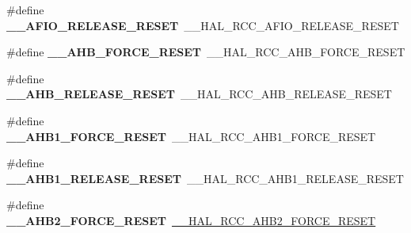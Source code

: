 \begin{DoxyCompactItemize}
\item 
\mbox{\label{group___h_a_l___r_c_c___aliased_gaadb5113bd9b830d9b8db0fa5764b23af}} 
\#define {\bfseries \+\_\+\+\_\+\+A\+F\+I\+O\+\_\+\+R\+E\+L\+E\+A\+S\+E\+\_\+\+R\+E\+S\+ET}~\+\_\+\+\_\+\+H\+A\+L\+\_\+\+R\+C\+C\+\_\+\+A\+F\+I\+O\+\_\+\+R\+E\+L\+E\+A\+S\+E\+\_\+\+R\+E\+S\+ET
\item 
\mbox{\label{group___h_a_l___r_c_c___aliased_ga1cc42f2b9cb1a6c13f6d2453f8fd6451}} 
\#define {\bfseries \+\_\+\+\_\+\+A\+H\+B\+\_\+\+F\+O\+R\+C\+E\+\_\+\+R\+E\+S\+ET}~\+\_\+\+\_\+\+H\+A\+L\+\_\+\+R\+C\+C\+\_\+\+A\+H\+B\+\_\+\+F\+O\+R\+C\+E\+\_\+\+R\+E\+S\+ET
\item 
\mbox{\label{group___h_a_l___r_c_c___aliased_gafd2237a0d990dfe8f203436c0e0315ee}} 
\#define {\bfseries \+\_\+\+\_\+\+A\+H\+B\+\_\+\+R\+E\+L\+E\+A\+S\+E\+\_\+\+R\+E\+S\+ET}~\+\_\+\+\_\+\+H\+A\+L\+\_\+\+R\+C\+C\+\_\+\+A\+H\+B\+\_\+\+R\+E\+L\+E\+A\+S\+E\+\_\+\+R\+E\+S\+ET
\item 
\mbox{\label{group___h_a_l___r_c_c___aliased_ga254ce7a1ec636007ff532aca4f2d7b30}} 
\#define {\bfseries \+\_\+\+\_\+\+A\+H\+B1\+\_\+\+F\+O\+R\+C\+E\+\_\+\+R\+E\+S\+ET}~\+\_\+\+\_\+\+H\+A\+L\+\_\+\+R\+C\+C\+\_\+\+A\+H\+B1\+\_\+\+F\+O\+R\+C\+E\+\_\+\+R\+E\+S\+ET
\item 
\mbox{\label{group___h_a_l___r_c_c___aliased_ga86aa3cb593141469e24fb5d133413484}} 
\#define {\bfseries \+\_\+\+\_\+\+A\+H\+B1\+\_\+\+R\+E\+L\+E\+A\+S\+E\+\_\+\+R\+E\+S\+ET}~\+\_\+\+\_\+\+H\+A\+L\+\_\+\+R\+C\+C\+\_\+\+A\+H\+B1\+\_\+\+R\+E\+L\+E\+A\+S\+E\+\_\+\+R\+E\+S\+ET
\item 
\mbox{\label{group___h_a_l___r_c_c___aliased_gabf07e4804f7486e35e0f0054675fab77}} 
\#define {\bfseries \+\_\+\+\_\+\+A\+H\+B2\+\_\+\+F\+O\+R\+C\+E\+\_\+\+R\+E\+S\+ET}~\mbox{\hyperlink{group___r_c_c_ex___force___release___peripheral___reset_gae82cd541f933be46ec8d6c3ea50d402c}{\+\_\+\+\_\+\+H\+A\+L\+\_\+\+R\+C\+C\+\_\+\+A\+H\+B2\+\_\+\+F\+O\+R\+C\+E\+\_\+\+R\+E\+S\+ET}}
\item 
\mbox{\label{group___h_a_l___r_c_c___aliased_ga9757b88e34916ad449503457d065b844}} 

\end{DoxyCompactItemize}
